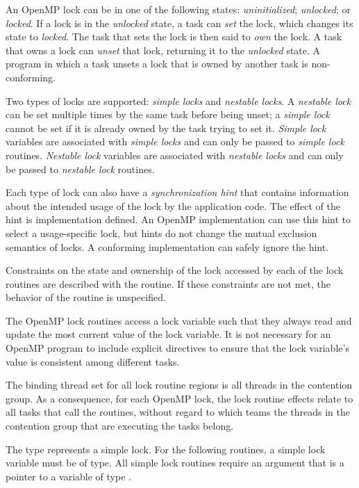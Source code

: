 An OpenMP lock can be in one of the following states: \emph{uninitialized}; 
\emph{unlocked}; or \emph{locked}. If a lock is in the \emph{unlocked} state, 
a task can \emph{set} the lock, which changes its state to \emph{locked}. 
The task that sets the lock is then said to \emph{own} the lock. A task 
that owns a lock can \emph{unset} that lock, returning it to the 
\emph{unlocked} state. A program in which a task unsets a lock that is 
owned by another task is non-conforming.

Two types of locks are supported: \emph{simple locks} and \emph{nestable locks}. 
A \emph{nestable lock} can be set multiple times by the same task before being 
unset; a \emph{simple lock} cannot be set if it is already owned by the task 
trying to set it. \emph{Simple lock} variables are associated with 
\emph{simple locks} and can only be passed to \emph{simple lock} routines. 
\emph{Nestable lock} variables are associated with \emph{nestable locks} and 
can only be passed to \emph{nestable lock} routines.

Each type of lock can also have a \emph{synchronization hint} that contains 
information about the intended usage of the lock by the application code.  
The effect of the hint is implementation defined.  An OpenMP implementation 
can use this hint to select a usage-specific lock, but hints do not change 
the mutual exclusion semantics of locks. A conforming implementation can 
safely ignore the hint.

Constraints on the state and ownership of the lock accessed by each of the 
lock routines are described with the routine. If these constraints are not 
met, the behavior of the routine is unspecified.

The OpenMP lock routines access a lock variable such that they always read
and update the most current value of the lock variable. It is not necessary 
for an OpenMP program to include explicit  directives to ensure 
that the lock variable's value is consistent among different tasks.

\binding
The binding thread set for all lock routine regions is all threads in the 
contention group. As a consequence, for each OpenMP lock, the lock routine 
effects relate to all tasks that call the routines, without regard to which 
teams the threads in the contention group that are executing the tasks belong.

\begin{ccppspecific}
The type  represents a simple lock. For the following 
routines, a simple lock variable must be of  type. All 
simple lock routines require an argument that is a pointer to a variable 
of type . 
\end{ccppspecific}

